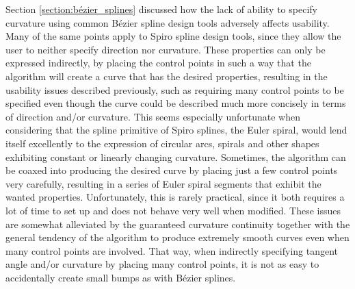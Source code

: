 \documentclass[a4paper]{article}
\begin{document}
				Section \ref{section:bézier_splines} discussed how the lack of ability to specify curvature using common Bézier spline design tools adversely affects usability. Many of the same points apply to Spiro spline design tools, since they allow the user to neither specify direction nor curvature. These properties can only be expressed indirectly, by placing the control points in such a way that the algorithm will create a curve that has the desired properties, resulting in the usability issues described previously, such as requiring many control points to be specified even though the curve could be described much more concisely in terms of direction and/or curvature. This seems especially unfortunate when considering that the spline primitive of Spiro splines, the Euler spiral, would lend itself excellently to the expression of circular arcs, spirals and other shapes exhibiting constant or linearly changing curvature. Sometimes, the algorithm can be coaxed into producing the desired curve by placing just a few control points very carefully, resulting in a series of Euler spiral segments that exhibit the wanted properties. Unfortunately, this is rarely practical, since it both requires a lot of time to set up and does not behave very well when modified. These issues are somewhat alleviated by the guaranteed curvature continuity together with the general tendency of the algorithm to produce extremely smooth curves even when many control points are involved. That way, when indirectly specifying tangent angle and/or curvature by placing many control points, it is not as easy to accidentally create small bumps as with Bézier splines.
\end{document}
